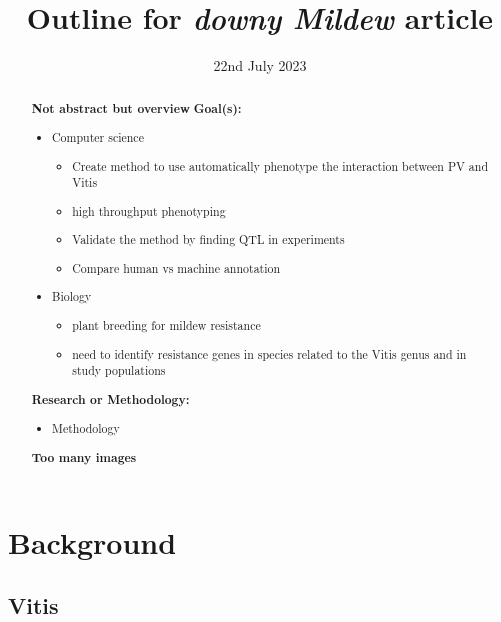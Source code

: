 \documentclass[english]{article}
\title{ Outline for \textit{downy Mildew} article}
\date{22nd July 2023}
\author{}
\begin{document}
\maketitle

\begin{changemargin}{60pt}{60pt}
	\begin{abstract}
		\textbf{Not abstract but overview}
		\textbf{Goal(s):}
		\begin{itemize}
			\item Computer science
			      \begin{itemize}
				      \item Create method to use automatically phenotype the interaction between PV and Vitis
				      \item high throughput phenotyping
				      \item Validate the method by finding QTL in  experiments
				      \item Compare human vs machine annotation
			      \end{itemize}
			\item Biology
			      \begin{itemize}
				      \item plant breeding for mildew resistance
				      \item need to identify resistance genes in species related to the Vitis genus and in study populations
			      \end{itemize}
		\end{itemize}

		\textbf{Research or Methodology:}
		\begin{itemize}
			\item Methodology
		\end{itemize}

		\textbf{Too many images}

	\end{abstract}
\end{changemargin}

\tableofcontents

\section{Background}

\subsection{Vitis}
\end{document}
